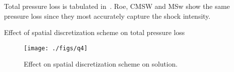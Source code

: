 Total pressure loss is tabulated in~. Roe, CMSW and MSw show the
same pressure loss since they most accurately capture the shock intensity.

\begin{table}
    \centering
    \caption{Effect of spatial discretization scheme on total pressure loss}
    \label{tab:q4_ploss}
    
\end{table}
\begin{figure}
    \centering
    \texttt{[image: ./figs/q4]}
    \caption{Effect on spatial discretization scheme on solution.}\label{fig:q4}
\end{figure}


